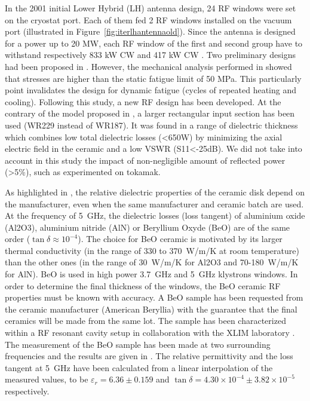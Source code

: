 In the 2001 initial Lower Hybrid (LH) antenna design, 24 RF windows were set on the cryostat port. Each of them fed 2 RF windows installed on the vacuum port (illustrated in Figure~\ref{fig:iterlhantennaold}). Since the antenna is designed for a power up to 20 MW, each RF window of the first and second group have to withstand respectively 833 kW CW and 417 kW CW . Two preliminary designs had been proposed in . However, the mechanical analysis performed in  showed that stresses are higher than the static fatigue limit of 50 MPa. This particularly point invalidates the design for dynamic fatigue (cycles of repeated heating and cooling). Following this study, a new RF design has been developed. At the contrary of the model proposed in \cite{bibet2001-1}, a larger rectangular input section has been used (WR229 instead of WR187). It was found in  a range of dielectric thickness which combines low total dielectric losses (<650W) by minimizing the axial electric field in the ceramic and a low VSWR (S11<-25dB). We did not take into account in this study the impact of non-negligible amount of reflected power (>5\%), such as experimented on tokamak.

As highlighted in , the relative dielectric properties of the ceramic disk depend on the manufacturer, even when the same manufacturer and ceramic batch are used. At the frequency of 5~GHz, the dielectric losses (loss tangent) of aluminium oxide (Al2O3), aluminium nitride (AlN) or Beryllium Oxyde (BeO) are of the same order ($\tan\delta \approx 10^{-4}$). The choice for BeO ceramic is motivated by its larger thermal conductivity (in the range of 330 to 370~\si{W/m/K} at room temperature) than the other ones (in the range of 30~\si{W/m/K} for Al2O3 and 70-180~\si{W/m/K} for AlN). BeO is used in high power 3.7~GHz and 5~GHz klystrons windows. In order to determine the final thickness of the windows, the BeO ceramic RF properties must be known with accuracy. A BeO sample has been requested from the ceramic manufacturer (American Beryllia) with the guarantee that the final ceramics will be made from the same lot. The sample has been characterized within a RF resonant cavity setup in collaboration with the XLIM laboratory . The measurement of the BeO sample has been made at two surrounding frequencies and the results are given in \cite{hillairet2015}. The relative permittivity and the loss tangent at 5~GHz have been calculated from a linear interpolation of the measured values, to be $\varepsilon_{r}=6.36\pm0.159$ and $\tan \delta = 4.30\times 10^{-4}\pm3.82\times 10^{-5}$ respectively. 

